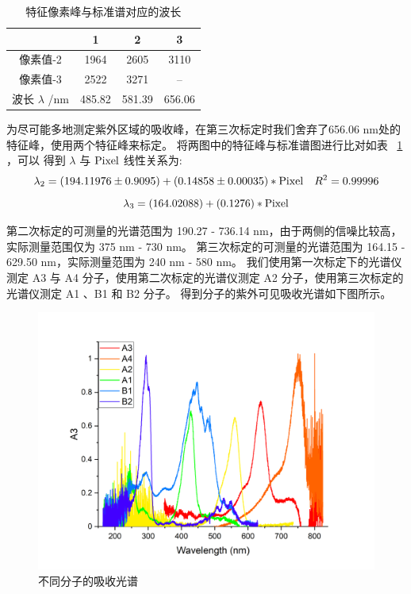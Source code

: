 \documentclass[cn,hazy,pku,12pt,normal,math=newtx,cite=super]{elegantnote}
\begin{document}
\begin{table}[htbp]
    \centering
    \caption{特征像素峰与标准谱对应的波长}\label{13}
    \begin{tabular}{cccc}
    \hline
            & 1      & 2      & 3      \\ \hline
    像素值-2     & 1964   & 2605   & 3110   \\
    像素值-3     & 2522   & 3271   & --   \\
    \multicolumn{1}{l}{波长 $\lambda$ /nm} & 485.82 & 581.39 & 656.06 \\ \hline
    \end{tabular}
\end{table}

为尽可能多地测定紫外区域的吸收峰，在第三次标定时我们舍弃了656.06 nm处的特征峰，使用两个特征峰来标定。
将两图中的特征峰与标准谱图进行比对如表 ~\ref{13} ，可以
得到 $\lambda$ 与  $ {\rm Pixel} $ 线性关系为:
\begin{equation}\label{nihe3}
    \lambda_2 = (194.11976 \pm 0.9095) + (0.14858 \pm 0.00035) * {\rm Pixel} \quad R^2=0.99996
\end{equation}
\begin{equation}\label{nihe4}
    \lambda_3 = (164.02088) + (0.1276) * {\rm Pixel}
\end{equation}

第二次标定的可测量的光谱范围为 190.27 - 736.14 nm，由于两侧的信噪比较高，实际测量范围仅为 375 nm - 730 nm。
第三次标定的可测量的光谱范围为 164.15 - 629.50 nm，实际测量范围为 240 nm - 580 nm。
我们使用第一次标定下的光谱仪测定 A3 与 A4 分子，使用第二次标定的光谱仪测定 A2 分子，使用第三次标定的光谱仪测定 A1 、B1 和 B2 分子。
得到分子的紫外可见吸收光谱如下图所示。

\begin{figure}[htbp]
    \centering
    \includegraphics[width = .70\textwidth]{image/guangpu.png}
    \caption{不同分子的吸收光谱}\label{14}
\end{figure}
\end{document}
